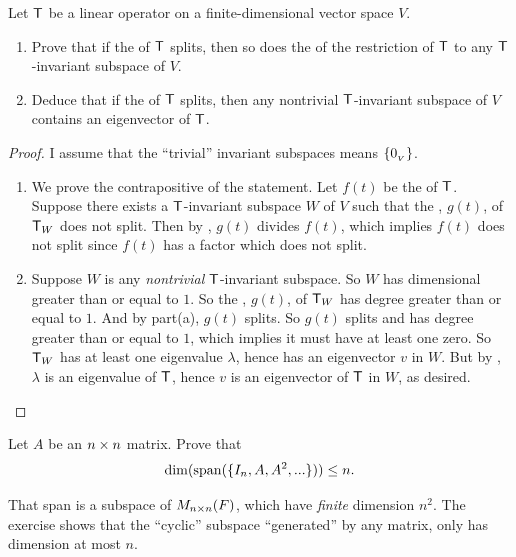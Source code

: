 \begin{exercise} \label{exercise 5.4.16}
Let \(\textsf{T}\) be a linear operator on a finite-dimensional vector space \(V\).
\begin{enumerate}
\item Prove that if the \CPOLY{} of \(\textsf{T}\) splits, then so does the \CPOLY{} of the restriction of \(\textsf{T}\) to any \(\textsf{T}\)-invariant subspace of \(V\).
\item Deduce that if the \CPOLY{} of \(\textsf{T}\) splits, then any nontrivial \(\textsf{T}\)-invariant subspace of \(V\) contains an eigenvector of \(\textsf{T}\).
\end{enumerate}
\end{exercise}

\begin{proof}
I assume that the ``trivial'' invariant subspaces means \(\{ 0_{_V} \}\).
\begin{enumerate}
\item We prove the contrapositive of the statement.
Let \(f(t)\) be the \CPOLY{} of \(\textsf{T}\).
Suppose there exists a \(\textsf{T}\)-invariant subspace \(W\) of \(V\) such that the \CPOLY{}, \(g(t)\), of \(\textsf{T}_W\) does not split.
Then by , \(g(t)\) divides \(f(t)\), which implies \(f(t)\) does not split since \(f(t)\) has a factor which does not split.

\item Suppose \(W\) is any \emph{nontrivial} \(\textsf{T}\)-invariant subspace.
So \(W\) has dimensional greater than or equal to \(1\).
So the \CPOLY{}, \(g(t)\), of \(\textsf{T}_W\) has degree greater than or equal to \(1\).
And by part(a), \(g(t)\) splits.
So \(g(t)\) splits and has degree greater than or equal to \(1\), which implies it must have at least one zero.
So \(\textsf{T}_W\) has at least one eigenvalue \(\lambda\), hence has an eigenvector \(v\) in \(W\).
But by , \(\lambda\) is an eigenvalue of \(\textsf{T}\), hence \(v\) is an eigenvector of \(\textsf{T}\) in \(W\), as desired.
\end{enumerate}
\end{proof}

\begin{exercise} \label{exercise 5.4.17}
Let \(A\) be an \(n \times n\) matrix.
Prove that
\[
    \dim(\operatorname{span}(\{ I_n, A, A^2, ... \})) \le n.
\]
\end{exercise}

\begin{note}
That span is a subspace of \(M_{n \times n}(F)\), which have \emph{finite} dimension \(n^2\).
The exercise shows that the ``cyclic'' subspace ``generated'' by any matrix, only has dimension at most \(n\).
\end{note}

